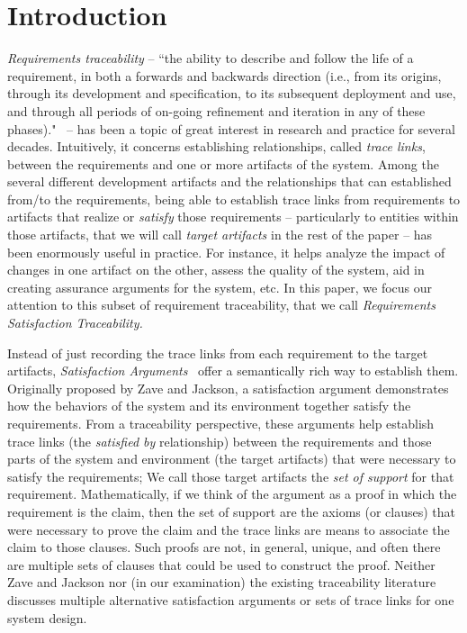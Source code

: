 \section{Introduction}

\emph{Requirements traceability} -- ``the ability to describe and follow the life of a requirement, in both a forwards and backwards direction (i.e., from its origins, through its development and specification, to its subsequent deployment and use, and through all periods of on-going refinement and iteration in any of these phases)."~\cite{gotel} -- has been a topic of great interest in research and practice for several decades. Intuitively, it concerns establishing relationships, called \emph{trace links}, between the requirements and one or more artifacts of the system. Among the several different development artifacts and the relationships that can established from/to the requirements, being able to establish trace links from requirements to artifacts that realize or \emph{satisfy} those requirements -- particularly to entities within those artifacts, that we will call \emph{target artifacts} in the rest of the paper -- has been enormously useful in practice. For instance, it helps analyze the impact of changes in one artifact on the other, assess the quality of the system, aid in creating assurance arguments for the system, etc. In this paper, we focus our attention to this subset of requirement traceability, that we call \emph{Requirements Satisfaction Traceability.}

Instead of just recording the trace links from each requirement to the target artifacts, \emph{Satisfaction Arguments}~\cite{zave1997four} offer a semantically rich way to establish them. Originally proposed by Zave and Jackson, a satisfaction argument demonstrates how the behaviors of the system and its environment together satisfy the requirements. From a traceability perspective, these arguments help establish trace links (the \emph{satisfied by} relationship) between the requirements and those parts of the system and environment (the target artifacts) that were necessary to satisfy the requirements; We call those target artifacts the \emph{set of support} for that requirement. Mathematically, if we think of the argument as a proof in which the requirement is the claim, then the set of support are the axioms (or clauses) that were necessary to prove the claim and the trace links are means to associate the claim to those clauses. Such proofs are not, in general, unique, and often there are multiple sets of clauses that could be used to construct the proof.  Neither Zave and Jackson nor (in our examination) the existing traceability literature discusses multiple alternative satisfaction arguments or sets of trace links for one system design. 

